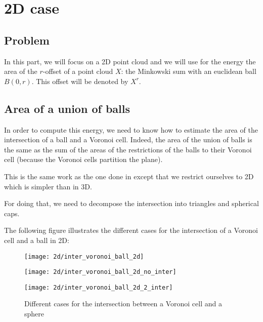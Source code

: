 \chapter{2D case}

\section{Problem}
In this part, we will focus on a 2D point cloud and we will use for the energy
the area of the $ r $-offset of a point cloud $ X $: the Minkowski sum with an euclidean
ball $ B(0, r) $. This offset will be denoted by $ X^r $.

\section{Area of a union of balls}
In order to compute this energy, we need to know how to estimate the area of the
intersection of a ball and a Voronoi cell. Indeed, the area of the union of
balls is the same as the sum of the areas of the restrictions of the balls to
their Voronoi cell (because the Voronoi cells partition the plane).

This is the same work as the one done in \cite{cazals2011computing} except that
we restrict ourselves to 2D which is simpler than in 3D.

For doing that, we need to decompose the intersection into triangles and
spherical caps.

The following figure illustrates the different cases for the intersection of a
Voronoi cell and a ball in 2D:
\begin{figure}[H]
    \centering
    \begin{minipage}{0.32\linewidth}
        \centering
        \texttt{[image: 2d/inter\_voronoi\_ball\_2d]}
        \label{fig:inter_voronoi_ball_2d:a}
    \end{minipage}
    \begin{minipage}{0.32\linewidth}
        \centering
        \texttt{[image: 2d/inter\_voronoi\_ball\_2d\_no\_inter]}
        \label{fig:inter_voronoi_ball_2d:b}
    \end{minipage}
    \begin{minipage}{0.32\linewidth}
        \centering
        \texttt{[image: 2d/inter\_voronoi\_ball\_2d\_2\_inter]}
        \label{fig:inter_voronoi_ball_2d:c}
    \end{minipage}

   \caption{Different cases for the intersection between a Voronoi cell and a sphere}
   \label{fig:inter_voronoi_ball_2d}
\end{figure}


